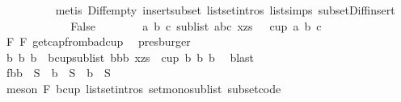 \begin{isabellebody}
\ \ \ \ \ \ \ \ \isamarkupfalse%
\ {\isacharparenleft}{\kern0pt}metis\ Diff{\isacharunderscore}{\kern0pt}empty\ insert{\isacharunderscore}{\kern0pt}subset\ list{\isachardot}{\kern0pt}set{\isacharunderscore}{\kern0pt}intros{\isacharparenleft}{\kern0pt}{}{\isacharparenright}{\kern0pt}\ list{\isachardot}{\kern0pt}simps{\isacharparenleft}{\kern0pt}{}{}{\isacharparenright}{\kern0pt}\ subset{\isacharunderscore}{\kern0pt}Diff{\isacharunderscore}{\kern0pt}insert{\isacharparenright}{\kern0pt}\isanewline
\ \ \ \ \isamarkupfalse%
\isanewline
\ \ \ \ \ \ \isamarkupfalse%
\ False\isanewline
\ \ \ \ \ \ \isamarkupfalse%
\ {\isachardoublequoteopen}{\isasymexists}a\ b\ c{\isachardot}{\kern0pt}\ {\isacharparenleft}{\kern0pt}sublist\ {\isacharbrackleft}{\kern0pt}a{\isacharcomma}{\kern0pt}b{\isacharcomma}{\kern0pt}c{\isacharbrackright}{\kern0pt}\ {\isacharparenleft}{\kern0pt}x{\isacharhash}{\kern0pt}zs{\isacharparenright}{\kern0pt}{\isacharparenright}{\kern0pt}\ {\isasymand}\ {\isasymnot}\ cup{}\ a\ b\ c{\isachardoublequoteclose}\isanewline
\ \ \ \ \ \ \ \ \isamarkupfalse%
\ F{}\ F{}\ get{\isacharunderscore}{\kern0pt}cap{\isacharunderscore}{\kern0pt}from{\isacharunderscore}{\kern0pt}bad{\isacharunderscore}{\kern0pt}cup\ \isamarkupfalse%
\ presburger\isanewline
\ \ \ \ \ \ \isamarkupfalse%
\ \isamarkupfalse%
\ b{}\ b{}\ b{}\ \ bcup{\isacharcolon}{\kern0pt}{\isachardoublequoteopen}sublist\ {\isacharbrackleft}{\kern0pt}b{}{\isacharcomma}{\kern0pt}b{}{\isacharcomma}{\kern0pt}b{}{\isacharbrackright}{\kern0pt}\ {\isacharparenleft}{\kern0pt}x{\isacharhash}{\kern0pt}zs{\isacharparenright}{\kern0pt}{\isachardoublequoteclose}\ {\isachardoublequoteopen}{\isasymnot}\ cup{}\ b{}\ b{}\ b{}{\isachardoublequoteclose}\ \isamarkupfalse%
\ blast\isanewline
\ \ \ \ \ \ \isamarkupfalse%
\ fb{}{\isacharcolon}{\kern0pt}{\isachardoublequoteopen}b{}\ {\isasymin}\ S\ {\isasymand}\ b{}\ {\isasymin}\ S\ {\isasymand}\ b{}\ {\isasymin}\ S{\isachardoublequoteclose}\ \isanewline
\ \ \ \ \ \ \ \ \isamarkupfalse%
\ {\isacharparenleft}{\kern0pt}meson\ F{}\ bcup\ list{\isachardot}{\kern0pt}set{\isacharunderscore}{\kern0pt}intros{\isacharparenleft}{\kern0pt}{}{\isacharcomma}{\kern0pt}{}{\isacharparenright}{\kern0pt}\ set{\isacharunderscore}{\kern0pt}mono{\isacharunderscore}{\kern0pt}sublist\ subset{\isacharunderscore}{\kern0pt}code{\isacharparenleft}{\kern0pt}{}{\isacharparenright}{\kern0pt}{\isacharparenright}{\kern0pt}\isanewline

\end{isabellebody}
